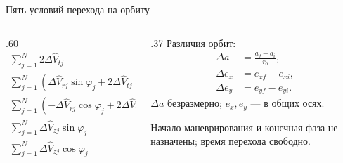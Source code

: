 \documentclass[11pt,aspectratio=169,t]{beamer}
\newcommand{\eqcompact}{\fontsize{10}{12}\selectfont}
\begin{document}
\begin{frame}{Пять условий перехода на орбиту}
\relax
\begin{columns}[T,onlytextwidth]
\begin{column}{.60\textwidth}
{\eqcompact\derivationmathspacing
\[
\boxed{\begin{aligned}
 \sum\nolimits_{j=1}^{N}2\Delta\widehat V_{tj}&=\Delta a,\\[7pt]
 \sum\nolimits_{j=1}^{N}(\Delta\widehat V_{rj}\sin\varphi_j
       +2\Delta\widehat V_{tj}\cos\varphi_j)&=\Delta e_x,\\[7pt]
 \sum\nolimits_{j=1}^{N}(-\Delta\widehat V_{rj}\cos\varphi_j
       +2\Delta\widehat V_{tj}\sin\varphi_j)&=\Delta e_y,\\[7pt]
 \sum\nolimits_{j=1}^{N}\Delta\widehat V_{zj}\sin\varphi_j&=0,\\[7pt]
 \sum\nolimits_{j=1}^{N}\Delta\widehat V_{zj}\cos\varphi_j&=\Delta i.
\end{aligned}}
\]
}
\end{column}
\begin{column}{.37\textwidth}
Различия орбит:
{\eqcompact\derivationmathspacing
\[
\begin{aligned}
 \Delta a&=\frac{a_f-a_i}{r_0},\\[3pt]
 \Delta e_x&=e_{xf}-e_{xi},\\[3pt]
 \Delta e_y&=e_{yf}-e_{yi}.
\end{aligned}
\]
}
\RaggedRight
$\Delta a$ безразмерно; $e_x,e_y$ — в общих осях.
\par\smallskip
Начало маневрирования и конечная фаза не назначены; время перехода свободно.
\end{column}
\end{columns}
\end{frame}
\end{document}
